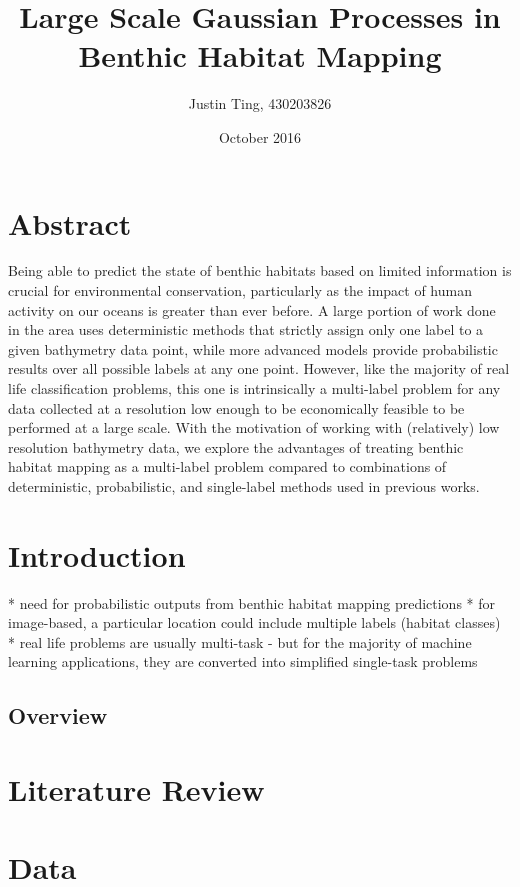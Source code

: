 \documentclass[10pt,sts]{article}
\title{Large Scale Gaussian Processes in Benthic Habitat Mapping}
\author{Justin Ting, 430203826}
\date{October 2016}
\begin{document}
\maketitle

    \section{Abstract}
    Being able to predict the state of benthic habitats based on limited information is crucial for environmental conservation, particularly as the impact of human activity on our oceans is greater than ever before. A large portion of work done in the area uses deterministic methods that strictly assign only one label to a given bathymetry data point, while more advanced models provide probabilistic results over all possible labels at any one point. However, like the majority of real life classification problems, this one is intrinsically a multi-label problem for any data collected at a resolution low enough to be economically feasible to be performed at a large scale. With the motivation of working with (relatively) low resolution bathymetry data, we explore the advantages of treating benthic habitat mapping as a multi-label problem compared to combinations of deterministic, probabilistic, and single-label methods used in previous works.

    \section{Introduction}
    * need for probabilistic outputs from benthic habitat mapping predictions
    * for image-based, a particular location could include multiple labels (habitat classes)
    * real life problems are usually multi-task - but for the majority of machine learning applications, they are converted into simplified single-task problems

    \subsection{Overview}

    \section{Literature Review}

    \section{Data}
\end{document}
